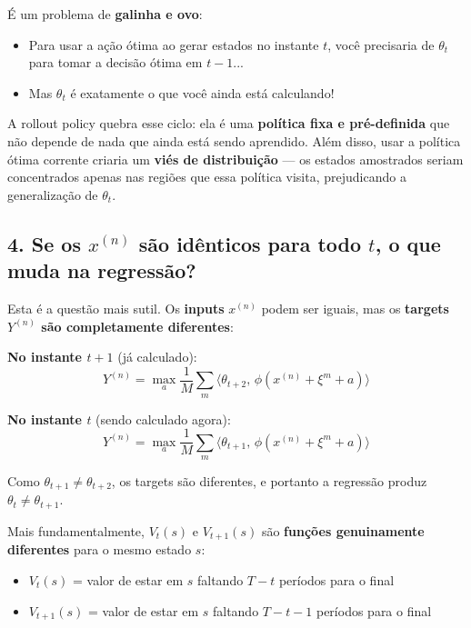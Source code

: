 \documentclass[12pt,a4paper]{article}
\begin{document}
É um problema de \textbf{galinha e ovo}:
\begin{itemize}
    \item Para usar a ação ótima ao gerar estados no instante $t$, você precisaria de $\theta_t$ para tomar a decisão ótima em $t-1$...
    \item Mas $\theta_t$ é exatamente o que você ainda está calculando!
\end{itemize}

A rollout policy quebra esse ciclo: ela é uma \textbf{política fixa e pré-definida} que não depende de nada que ainda está sendo aprendido. Além disso, usar a política ótima corrente criaria um \textbf{viés de distribuição} --- os estados amostrados seriam concentrados apenas nas regiões que essa política visita, prejudicando a generalização de $\theta_t$.

\subsection{4. Se os \texorpdfstring{$x^{(n)}$}{x(n)} são idênticos para todo \texorpdfstring{$t$}{t}, o que muda na regressão?}

Esta é a questão mais sutil. Os \textbf{inputs} $x^{(n)}$ podem ser iguais, mas os \textbf{targets $Y^{(n)}$ são completamente diferentes}:

\textbf{No instante $t+1$} (já calculado):
\begin{equation}
    Y^{(n)} = \max_a \frac{1}{M}\sum_m \langle \theta_{t+2},\, \phi(x^{(n)}+\xi^m+a) \rangle
\end{equation}

\textbf{No instante $t$} (sendo calculado agora):
\begin{equation}
    Y^{(n)} = \max_a \frac{1}{M}\sum_m \langle \theta_{t+1},\, \phi(x^{(n)}+\xi^m+a) \rangle
\end{equation}

Como $\theta_{t+1} \neq \theta_{t+2}$, os targets são diferentes, e portanto a regressão produz $\theta_t \neq \theta_{t+1}$.

Mais fundamentalmente, $V_t(s)$ e $V_{t+1}(s)$ são \textbf{funções genuinamente diferentes} para o mesmo estado $s$:
\begin{itemize}
    \item $V_t(s)$ = valor de estar em $s$ faltando $T-t$ períodos para o final
    \item $V_{t+1}(s)$ = valor de estar em $s$ faltando $T-t-1$ períodos para o final
\end{itemize}
\end{document}
